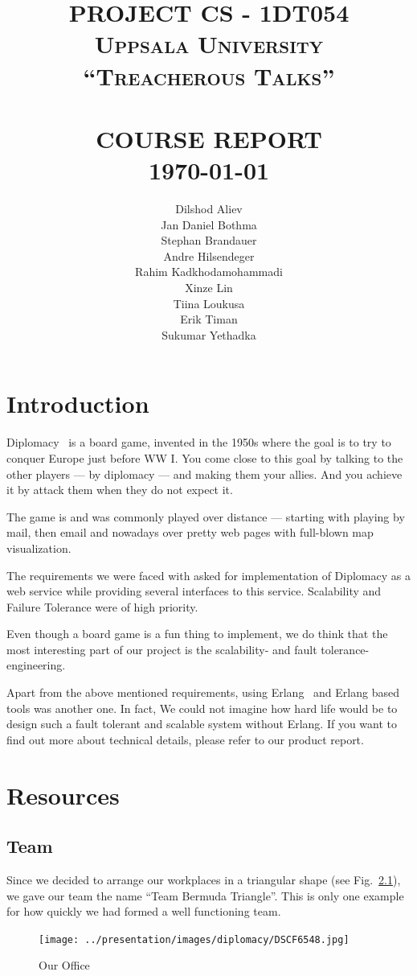 \documentclass[11pt,a4paper]{report}
\title{    
            \large \textbf{\uppercase{Project CS - 1DT054}}\\    %
            \large \textsc{Uppsala University}\\[2.0cm]    %
            \normalsize \textsc{``Treacherous Talks''} %
             \\[2.0cm]                                %
            \HRule{0.5pt} \\                          %
            \LARGE \textbf{\uppercase{Course Report}} %
            \HRule{2pt} \\ [0.5cm]                    %
            \normalsize \today                        %
        }
\author{Dilshod Aliev\\
        Jan Daniel Bothma\\
        Stephan Brandauer\\
        Andre Hilsendeger\\
        Rahim Kadkhodamohammadi\\
        Xinze Lin\\
        Tiina Loukusa\\
        Erik Timan\\
        Sukumar Yethadka\\
        }
\makeatletter
\def\printtitle{
    {\centering \@title\par}}
\def\printauthor{
    {\centering \large \@author}}
\makeatother
\begin{document}
\thispagestyle{empty}                %

\printtitle
\vfill
\printauthor

\tableofcontents

\chapter{Introduction}
Diplomacy~\cite{diplomacy} is a board game, invented in the 1950s where the goal is to try to
conquer Europe just before WW I. You come close to this goal by talking to the
other players --- by diplomacy --- and making them your allies. And you achieve
it by attack them when they do not expect it.

The game is and was commonly played over distance --- starting with playing by
mail, then email and nowadays over pretty web pages with full-blown map
visualization.

The requirements we were faced with asked for implementation of Diplomacy as a
web service while providing several interfaces to this service. Scalability and
Failure Tolerance were of high priority.

Even though a board game is a fun thing to implement, we do think that the most
interesting part of our project is the scalability- and fault tolerance-
engineering.

Apart from the above mentioned requirements, using Erlang~\cite{erlang_proglang}
and Erlang based tools was another one. 
In fact, We could not imagine how hard life would be 
to design such a fault tolerant and scalable system without Erlang. If you want
to find out more about technical details, please refer to our product report.

\chapter{Resources}
\section{Team}
Since we decided to arrange our workplaces in a triangular shape (see
Fig.~\ref{fig:office}), we gave our team the name ``Team Bermuda Triangle''.
This is only one example for how quickly we had formed a well functioning
team. \\
\begin{figure}[h]
 \centering
 \texttt{[image: ../presentation/images/diplomacy/DSCF6548.jpg]}
 \caption{Our Office}
 \label{fig:office}
\end{figure}
\end{document}
